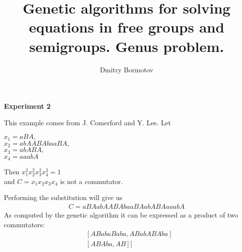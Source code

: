 \documentclass{slides}
\title{Genetic algorithms for solving
equations in free groups and semigroups.  Genus problem.}
\author{Dmitry Bormotov} \date{}
\begin{document}
\pagestyle{empty}

\begin{center} \Large\textbf{Experiment 2} \end{center}

This example comes from J. Comerford and Y. Lee. Let

$x_1 = a B A,$ \\
$x_2 = a b A A B A b a a B A,$ \\
$x_3 = a b A B A,$ \\
$x_4 = a a a b A$

Then $x_1^2 x_2^2 x_3^2 x_4^2 = 1$ \\ 
and $C = x_1 x_2 x_3 x_4$ is not a commutator.

Performing the substitution will give us 
\begin{eqnarray*}
C = a B A a b A A B A b a a B A a b A B A a a a b A
\end{eqnarray*}
As computed by the genetic algorithm it can be expressed as a product
of two commutators:
\begin{eqnarray*}
& [ A B a b a B a b a, A B a b A B A b a ] \\
& [ A B A b a, A B ] ] \\
\end{eqnarray*}
\end{document}
